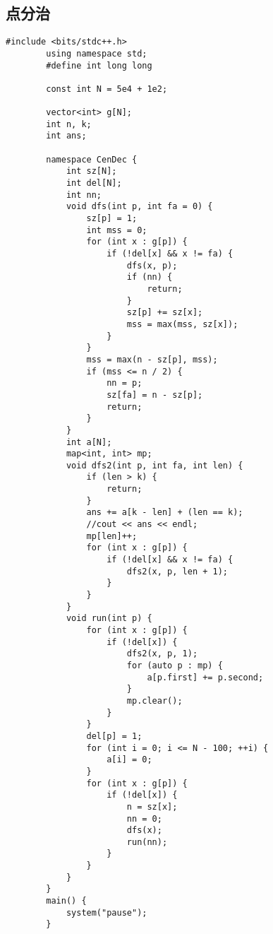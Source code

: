 \documentclass[12pt, a4paper]{ctexart}
\begin{document}
	\subsection{点分治}
	\begin{lstlisting}[caption={}]
		#include <bits/stdc++.h>
		using namespace std;
		#define int long long
		
		const int N = 5e4 + 1e2;
		
		vector<int> g[N];
		int n, k;
		int ans;
		
		namespace CenDec {
			int sz[N];
			int del[N];
			int nn;
			void dfs(int p, int fa = 0) {
				sz[p] = 1;
				int mss = 0;
				for (int x : g[p]) {
					if (!del[x] && x != fa) {
						dfs(x, p);
						if (nn) {
							return;
						}
						sz[p] += sz[x];
						mss = max(mss, sz[x]);
					}
				}
				mss = max(n - sz[p], mss);
				if (mss <= n / 2) {
					nn = p;
					sz[fa] = n - sz[p];
					return;
				}
			}
			int a[N];
			map<int, int> mp;
			void dfs2(int p, int fa, int len) {
				if (len > k) {
					return;
				}
				ans += a[k - len] + (len == k);
				//cout << ans << endl;
				mp[len]++;
				for (int x : g[p]) {
					if (!del[x] && x != fa) {
						dfs2(x, p, len + 1);
					}
				}
			}
			void run(int p) {
				for (int x : g[p]) {
					if (!del[x]) {
						dfs2(x, p, 1);
						for (auto p : mp) {
							a[p.first] += p.second;
						}
						mp.clear();
					}
				}
				del[p] = 1;
				for (int i = 0; i <= N - 100; ++i) {
					a[i] = 0;
				}
				for (int x : g[p]) {
					if (!del[x]) {
						n = sz[x];
						nn = 0;
						dfs(x);
						run(nn);
					}
				}
			}
		}
		main() {
			system("pause");
		}
	\end{lstlisting}
\end{document}
